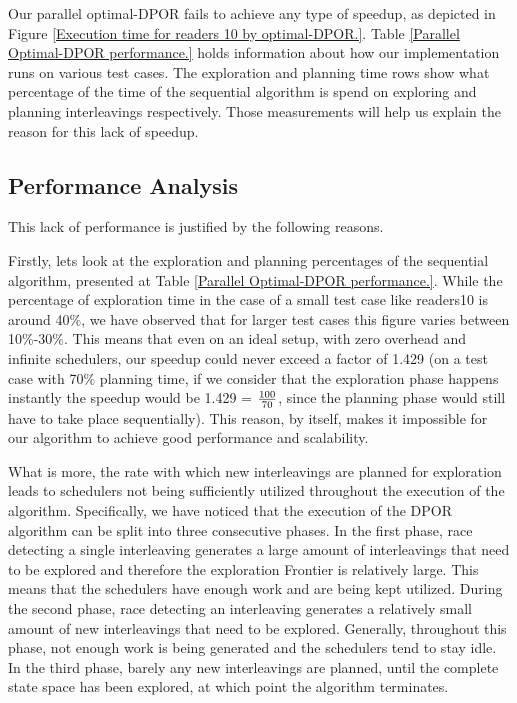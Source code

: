 Our parallel optimal-DPOR fails to achieve any type of speedup, as depicted in Figure 
\ref{Execution time for readers 10 by optimal-DPOR.}. Table \ref{Parallel Optimal-DPOR performance.}
holds information about how our implementation runs on various test cases. The exploration and planning
time rows show what percentage of the time of the sequential algorithm is spend on exploring and planning interleavings respectively.
Those measurements will help us explain the reason for this lack of speedup.




\subsection{Performance Analysis}

This lack of performance is justified by the following reasons.

Firstly, lets look at the exploration and planning percentages of the sequential algorithm,
presented at Table \ref{Parallel Optimal-DPOR performance.}. While the percentage of exploration time in the case of a small test
case like readers10 is around 40$\%$, we have observed that for larger test cases this figure varies between 10$\%$-30$\%$. 
This means that even on an ideal setup, with zero overhead and infinite schedulers, our speedup could never exceed a factor
of 1.429 (on a test case with 70$\%$ planning time, if we consider that the exploration phase happens instantly the 
speedup would be 1.429 = $100\over 70$, since the planning phase would still have to take place sequentially). 
This reason, by itself, makes it impossible for our algorithm to achieve good performance and scalability.

What is more, the rate with which new interleavings are planned for exploration leads to schedulers not being sufficiently utilized throughout the execution of the algorithm. Specifically, we have noticed that the execution of the DPOR algorithm can be split into three consecutive phases. In the first phase, race detecting a single interleaving generates a large amount of interleavings that need to be explored and therefore the exploration Frontier is relatively large. This means that the schedulers have enough work and are being kept utilized. During the second phase, race detecting an interleaving generates a relatively small amount of new interleavings that need to be explored. Generally, throughout this phase, not enough work is being generated and the schedulers tend to stay idle. In the third phase,
barely any new interleavings are planned, until the complete state space has been explored, at which point the algorithm terminates. 

